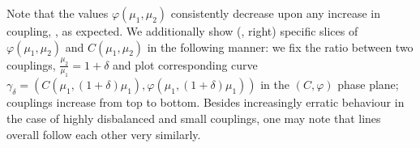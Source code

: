 \documentclass{mynotes}
\begin{document}
Note that the values \( \varphi(\mu_1, \mu_2 )\) consistently decrease upon any increase in coupling, , as expected. We additionally show (, right) specific slices of \( \varphi(\mu_1, \mu_2 )\) and \( C(\mu_1, \mu_2 )\) in the following manner: we fix the ratio between two couplings, \( \frac{\mu_2}{\mu_1} = 1 + \delta \) and plot corresponding curve \( \gamma_\delta = ( C(\mu_1, (1+\delta)\mu_1 ), \varphi(\mu_1, (1+\delta)\mu_1 )  )\) in the \( ( C, \varphi ) \) phase plane; couplings increase from top to bottom. Besides increasingly erratic behaviour in the case of highly disbalanced and small couplings, one may note that lines overall follow each other very similarly. 




















\clearpage
\nocite{*}


\end{document}
